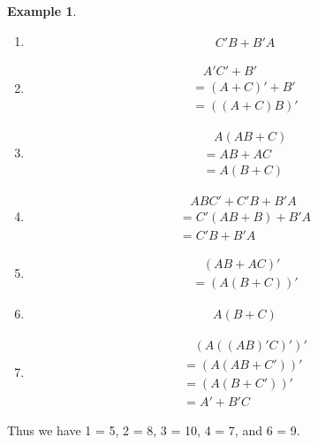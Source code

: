 \documentclass[12pt]{article}
\theoremstyle{definition}
\newtheorem{example}{Example}[section]
\begin{document}
$$\begin{example}
\begin{enumerate}
\begin{align*}
            &B'C+A'
        \end{align*}
        \item \begin{align*}
            &C'B+B'A
        \end{align*}
        \item \begin{align*}
            &\ \ \ \ A'C'+B'\\
            &= (A+C)'+B'\\
            &= ((A+C)B)'
        \end{align*}
        \item \begin{align*}
            &\ \ \ \ A(AB+C)\\
            &= AB+AC\\
            &= A(B+C)
        \end{align*}
        \item \begin{align*}
            &\ \ \ \ ABC' + C'B + B'A\\
            &= C'(AB + B) + B'A\\
            &= C'B + B'A
        \end{align*}
        \item \begin{align*}
            &\ \ \ \ (AB+AC)'\\
            &= (A(B+C))'
        \end{align*}
        \item \begin{align*}
            &A(B+C)
        \end{align*}
        \item \begin{align*}
            &\ \ \ \ (A((AB)'C)')'\\
            &= (A(AB+C'))'\\
            &= (A(B+C'))'\\
            &= A' + B'C
        \end{align*}
    \end{enumerate}
    Thus we have 1 = 5, 2 = 8, 3 = 10, 4 = 7, and 6 = 9.  
\end{example}
\end{document}
